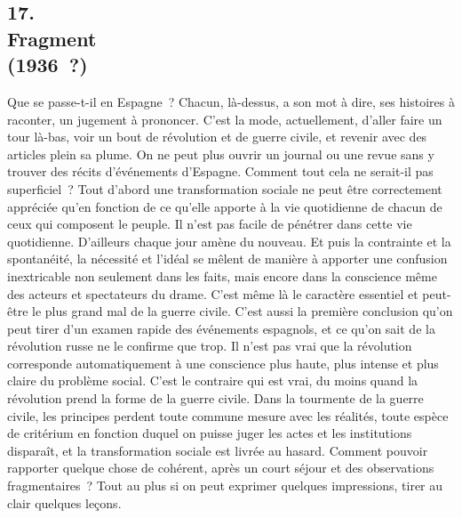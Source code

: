 \documentclass[french,twoside]{book} %
\begin{document}
\begin{center}
\noindent \centerline{}
\end{center}

\subsection[{17. Fragment, (1936 ?)}]{17. \\
Fragment \\
(1936 ?)}
\noindent \par
Que se passe-t-il en Espagne ? Chacun, là-dessus, a son mot à dire, ses histoires à raconter, un jugement à prononcer. C'est la mode, actuellement, d'aller faire un tour là-bas, voir un bout de révolution et de guerre civile, et revenir avec des articles plein sa plume. On ne peut plus ouvrir un journal ou une revue sans y trouver des récits d'événements d'Espagne. Comment tout cela ne serait-il pas superficiel ? Tout d'abord une transformation sociale ne peut être correctement appréciée qu'en fonction de ce qu'elle apporte à la vie quotidienne de chacun de ceux qui composent le peuple. Il n'est pas facile de pénétrer dans cette vie quotidienne. D'ailleurs chaque jour amène du nouveau. Et puis la contrainte et la spontanéité, la nécessité et l'idéal se mêlent de manière à apporter une confusion inextricable non seulement dans les faits, mais encore dans la conscience même des acteurs et spectateurs du drame. C'est même là le caractère essentiel et peut-être le plus grand mal de la guerre civile. C'est aussi la première conclusion qu'on peut tirer d'un examen rapide des événements espagnols, et ce qu'on sait de la révolution russe ne le confirme que trop. Il n'est pas vrai que la révolution corresponde automati­quement à une conscience plus haute, plus intense et plus claire du problème social. C'est le contraire qui est vrai, du moins quand la révolution prend la forme de la guerre civile. Dans la tourmente de la guerre civile, les principes perdent toute commune mesure avec les réalités, toute espèce de critérium en fonction duquel on puisse juger les actes et les institutions disparaît, et la transformation sociale est livrée au hasard. Comment pouvoir rapporter quelque chose de cohérent, après un court séjour et des observations frag­mentaires ? Tout au plus si on peut exprimer quelques impressions, tirer au clair quelques leçons.\par

\begin{center}
\noindent \centerline{}
\end{center}
\end{document}
